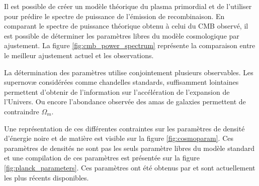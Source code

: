 Il est possible de créer un modèle théorique du plasma primordial et de l'utiliser pour prédire le spectre de puissance de l'émission de recombinaison.
En comparant le spectre de puissance théorique obtenu à celui du \ac{CMB} observé, il est possible de déterminer les paramètres libres du modèle cosmologique par ajustement.
La figure \ref{fig:cmb_power_spectrum} représente la comparaison entre le meilleur ajustement actuel et les observations.

La détermination des paramètres utilise conjointement plusieurs observables.
Les supernovæ considérées comme chandelles standards, suffisamment lointaines permettent d'obtenir de l'information sur l'accélération de l'expansion de l'Univers.
Ou encore l'abondance observée des amas de galaxies permettent de contraindre $\Omega_m$.



Une représentation de ces différentes contraintes sur les paramètres de densité d'énergie noire et de matière est visible sur la figure \ref{fig:cosmoparam}.
Ces paramètres de densités ne sont pas les seuls paramètre libres du modèle standard et une compilation de ces paramètres est présentée sur la figure \ref{fig:planck_parameters}.
Ces paramètres ont été obtenus par \cite{planck_collaboration_planck_2016} et sont actuellement les plus récents disponibles.

